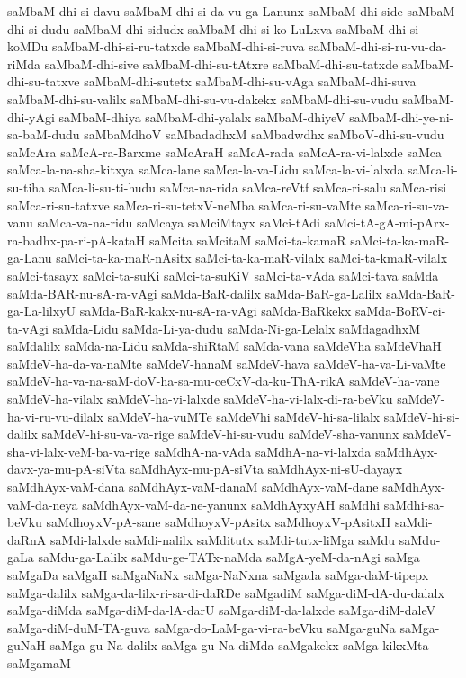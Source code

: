 {saMbaM-dhi-si-davu
saMbaM-dhi-si-da-vu-ga-Lanunx
saMbaM-dhi-side
saMbaM-dhi-si-dudu
saMbaM-dhi-sidudx
saMbaM-dhi-si-ko-LuLxva
saMbaM-dhi-si-koMDu
saMbaM-dhi-si-ru-tatxde
saMbaM-dhi-si-ruva
saMbaM-dhi-si-ru-vu-da-riMda
saMbaM-dhi-sive
saMbaM-dhi-su-tAtxre
saMbaM-dhi-su-tatxde
saMbaM-dhi-su-tatxve
saMbaM-dhi-sutetx
saMbaM-dhi-su-vAga
saMbaM-dhi-suva
saMbaM-dhi-su-valilx
saMbaM-dhi-su-vu-dakekx
saMbaM-dhi-su-vudu
saMbaM-dhi-yAgi
saMbaM-dhiya
saMbaM-dhi-yalalx
saMbaM-dhiyeV
saMbaM-dhi-ye-ni-sa-baM-dudu
saMbaMdhoV
saMbadadhxM
saMbadwdhx
saMboV-dhi-su-vudu
saMcAra
saMcA-ra-Barxme
saMcAraH
saMcA-rada
saMcA-ra-vi-lalxde
saMca
saMca-la-na-sha-kitxya
saMca-lane
saMca-la-va-Lidu
saMca-la-vi-lalxda
saMca-li-su-tiha
saMca-li-su-ti-hudu
saMca-na-rida
saMca-reVtf
saMca-ri-salu
saMca-risi
saMca-ri-su-tatxve
saMca-ri-su-tetxV-neMba
saMca-ri-su-vaMte
saMca-ri-su-va-vanu
saMca-va-na-ridu
saMcaya
saMciMtayx
saMci-tAdi
saMci-tA-gA-mi-pArx-ra-badhx-pa-ri-pA-kataH
saMcita
saMcitaM
saMci-ta-kamaR
saMci-ta-ka-maR-ga-Lanu
saMci-ta-ka-maR-nAsitx
saMci-ta-ka-maR-vilalx
saMci-ta-kmaR-vilalx
saMci-tasayx
saMci-ta-suKi
saMci-ta-suKiV
saMci-ta-vAda
saMci-tava
saMda
saMda-BAR-nu-sA-ra-vAgi
saMda-BaR-dalilx
saMda-BaR-ga-Lalilx
saMda-BaR-ga-La-lilxyU
saMda-BaR-kakx-nu-sA-ra-vAgi
saMda-BaRkekx
saMda-BoRV-ci-ta-vAgi
saMda-Lidu
saMda-Li-ya-dudu
saMda-Ni-ga-Lelalx
saMdagadhxM
saMdalilx
saMda-na-Lidu
saMda-shiRtaM
saMda-vana
saMdeVha
saMdeVhaH
saMdeV-ha-da-va-naMte
saMdeV-hanaM
saMdeV-hava
saMdeV-ha-va-Li-vaMte
saMdeV-ha-va-na-saM-doV-ha-sa-mu-ceCxV-da-ku-ThA-rikA
saMdeV-ha-vane
saMdeV-ha-vilalx
saMdeV-ha-vi-lalxde
saMdeV-ha-vi-lalx-di-ra-beVku
saMdeV-ha-vi-ru-vu-dilalx
saMdeV-ha-vuMTe
saMdeVhi
saMdeV-hi-sa-lilalx
saMdeV-hi-si-dalilx
saMdeV-hi-su-va-va-rige
saMdeV-hi-su-vudu
saMdeV-sha-vanunx
saMdeV-sha-vi-lalx-veM-ba-va-rige
saMdhA-na-vAda
saMdhA-na-vi-lalxda
saMdhAyx-davx-ya-mu-pA-siVta
saMdhAyx-mu-pA-siVta
saMdhAyx-ni-sU-dayayx
saMdhAyx-vaM-dana
saMdhAyx-vaM-danaM
saMdhAyx-vaM-dane
saMdhAyx-vaM-da-neya
saMdhAyx-vaM-da-ne-yanunx
saMdhAyxyAH
saMdhi
saMdhi-sa-beVku
saMdhoyxV-pA-sane
saMdhoyxV-pAsitx
saMdhoyxV-pAsitxH
saMdi-daRnA
saMdi-lalxde
saMdi-nalilx
saMditutx
saMdi-tutx-liMga
saMdu
saMdu-gaLa
saMdu-ga-Lalilx
saMdu-ge-TATx-naMda
saMgA-yeM-da-nAgi
saMga
saMgaDa
saMgaH
saMgaNaNx
saMga-NaNxna
saMgada
saMga-daM-tipepx
saMga-dalilx
saMga-da-lilx-ri-sa-di-daRDe
saMgadiM
saMga-diM-dA-du-dalalx
saMga-diMda
saMga-diM-da-lA-darU
saMga-diM-da-lalxde
saMga-diM-daleV
saMga-diM-duM-TA-guva
saMga-do-LaM-ga-vi-ra-beVku
saMga-guNa
saMga-guNaH
saMga-gu-Na-dalilx
saMga-gu-Na-diMda
saMgakekx
saMga-kikxMta
saMgamaM
}
